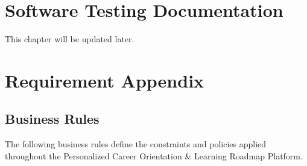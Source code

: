\chapter{Software Testing Documentation}

This chapter will be updated later.


\chapter{Requirement Appendix}

\section{Business Rules}

The following business rules define the constraints and policies applied throughout the Personalized Career Orientation \& Learning Roadmap Platform.

